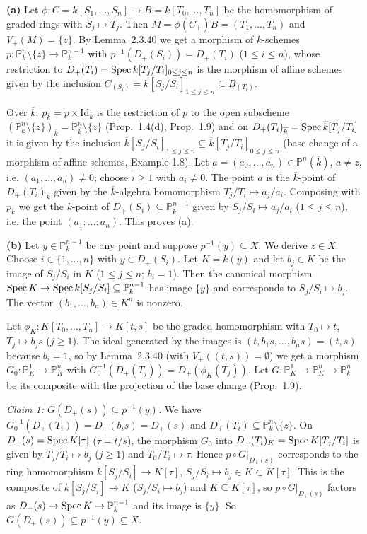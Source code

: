 \documentclass[11pt]{article}
\begin{document}
\textbf{(a)} Let $\phi:C=k[S_1,\dots,S_n]\to B=k[T_0,\dots,T_n]$ be the homomorphism of graded rings with $S_j\mapsto T_j$. Then $M=\phi(C_+)B=(T_1,\dots,T_n)$ and $V_+(M)=\{z\}$. By Lemma~2.3.40 we get a morphism of $k$-schemes $p:\mathbb P^n_k\setminus\{z\}\to\mathbb P^{n-1}_k$ with $p^{-1}(D_+(S_i))=D_+(T_i)$ ($1\le i\le n$), whose restriction to $D_+(T_i)=\operatorname{Spec} k[T_j/T_i]_{0\le j\le n}$ is the morphism of affine schemes given by the inclusion $C_{(S_i)}=k[S_j/S_i]_{1\le j\le n}\subseteq B_{(T_i)}$.

Over $\overline k$: $p_{\overline k}=p\times\mathrm{Id}_{\overline k}$ is the restriction of $p$ to the open subscheme $(\mathbb P^n_k\setminus\{z\})_{\overline k}=\mathbb P^n_{\overline k}\setminus\{z\}$ (Prop.~1.4(d), Prop.~1.9) and on $D_+(T_i)_{\overline k}=\operatorname{Spec}\overline k[T_j/T_i]$ it is given by the inclusion $\overline k[S_j/S_i]_{1\le j\le n}\subseteq\overline k[T_j/T_i]_{0\le j\le n}$ (base change of a morphism of affine schemes, Example 1.8). Let $a=(a_0,\dots,a_n)\in\mathbb P^n(\overline k)$, $a\ne z$, i.e. $(a_1,\dots,a_n)\neq0$; choose $i\ge1$ with $a_i\ne0$. The point $a$ is the $\overline k$-point of $D_+(T_i)_{\overline k}$ given by the $\overline k$-algebra homomorphism $T_j/T_i\mapsto a_j/a_i$. Composing with $p_{\overline k}$ we get the $\overline k$-point of $D_+(S_i)\subseteq\mathbb P^{n-1}_{\overline k}$ given by $S_j/S_i\mapsto a_j/a_i$ ($1\le j\le n$), i.e. the point $(a_1:\dots:a_n)$. This proves (a).

\textbf{(b)} Let $y\in\mathbb P^{n-1}_k$ be any point and suppose $p^{-1}(y)\subseteq X$. We derive $z\in X$. Choose $i\in\{1,\dots,n\}$ with $y\in D_+(S_i)$. Let $K=k(y)$ and let $b_j\in K$ be the image of $S_j/S_i$ in $K$ ($1\le j\le n$; $b_i=1$). Then the canonical morphism $\operatorname{Spec} K\to\operatorname{Spec} k[S_j/S_i]\subseteq\mathbb P^{n-1}_k$ has image $\{y\}$ and corresponds to $S_j/S_i\mapsto b_j$. The vector $(b_1,\dots,b_n)\in K^n$ is nonzero.

Let $\phi_K:K[T_0,\dots,T_n]\to K[t,s]$ be the graded homomorphism with $T_0\mapsto t$, $T_j\mapsto b_js$ ($j\ge1$). The ideal generated by the images is $(t,b_1s,\dots,b_ns)=(t,s)$ because $b_i=1$, so by Lemma~2.3.40 (with $V_+((t,s))=\emptyset$) we get a morphism $G_0:\mathbb P^1_K\to\mathbb P^n_K$ with $G_0^{-1}(D_+(T_j))=D_+(\phi_K(T_j))$. Let $G:\mathbb P^1_K\to\mathbb P^n_K\to\mathbb P^n_k$ be its composite with the projection of the base change (Prop.~1.9).

\emph{Claim 1: $G(D_+(s))\subseteq p^{-1}(y)$.} We have $G_0^{-1}(D_+(T_i))=D_+(b_is)=D_+(s)$ and $D_+(T_i)\subseteq\mathbb P^n_k\setminus\{z\}$. On $D_+(s)=\operatorname{Spec} K[\tau]$ ($\tau=t/s$), the morphism $G_0$ into $D_+(T_i)_K=\operatorname{Spec} K[T_j/T_i]$ is given by $T_j/T_i\mapsto b_j$ ($j\ge1$) and $T_0/T_i\mapsto\tau$. Hence $p\circ G|_{D_+(s)}$ corresponds to the ring homomorphism $k[S_j/S_i]\to K[\tau]$, $S_j/S_i\mapsto b_j\in K\subset K[\tau]$. This is the composite of $k[S_j/S_i]\to K$ ($S_j/S_i\mapsto b_j$) and $K\subseteq K[\tau]$, so $p\circ G|_{D_+(s)}$ factors as $D_+(s)\to\operatorname{Spec} K\to\mathbb P^{n-1}_k$ and its image is $\{y\}$. So $G(D_+(s))\subseteq p^{-1}(y)\subseteq X$.
\end{document}
